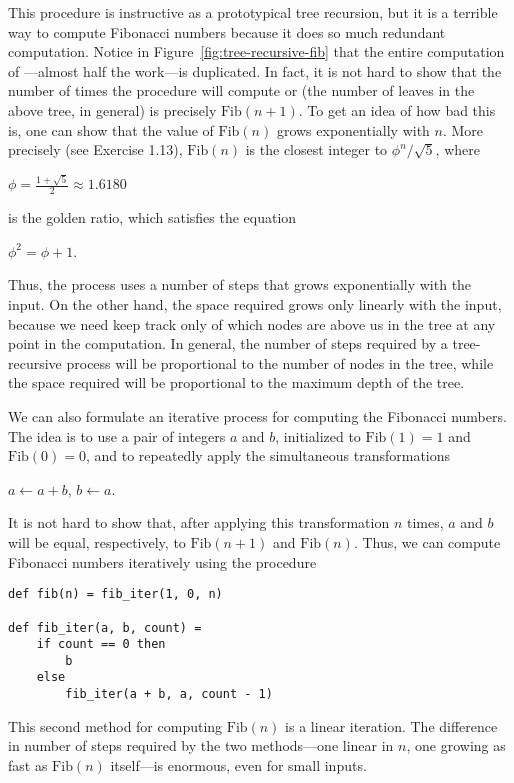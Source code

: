 This procedure is instructive as a prototypical tree recursion, but it is a terrible way to compute Fibonacci numbers because it does so much redundant computation. Notice in Figure~\ref{fig:tree-recursive-fib} that the entire computation of ---almost half the work---is duplicated. In fact, it is not hard to show that the number of times the procedure will compute  or  (the number of leaves in the above tree, in general) is precisely $\text{Fib}(n + 1)$. To get an idea of how bad this is, one can show that the value of $\text{Fib}(n)$ grows exponentially with $n$. More precisely (see Exercise 1.13), $\text{Fib}(n)$ is the closest integer to $\phi^n/\sqrt{5}$, where

$\phi = \frac{1 + \sqrt{5}}{2} \approx 1.6180$

is the golden ratio, which satisfies the equation

$\phi^2 = \phi + 1$.

Thus, the process uses a number of steps that grows exponentially with the input. On the other hand, the space required grows only linearly with the input, because we need keep track only of which nodes are above us in the tree at any point in the computation. In general, the number of steps required by a tree-recursive process will be proportional to the number of nodes in the tree, while the space required will be proportional to the maximum depth of the tree.

We can also formulate an iterative process for computing the Fibonacci numbers. The idea is to use a pair of integers $a$ and $b$, initialized to $\text{Fib}(1) = 1$ and $\text{Fib}(0) = 0$, and to repeatedly apply the simultaneous transformations

$a \leftarrow a + b$,
$b \leftarrow a$.

It is not hard to show that, after applying this transformation $n$ times, $a$ and $b$ will be equal, respectively, to $\text{Fib}(n + 1)$ and $\text{Fib}(n)$. Thus, we can compute Fibonacci numbers iteratively using the procedure

\begin{lstlisting}
def fib(n) = fib_iter(1, 0, n)

def fib_iter(a, b, count) =
    if count == 0 then
        b
    else
        fib_iter(a + b, a, count - 1)
\end{lstlisting}

This second method for computing $\text{Fib}(n)$ is a linear iteration. The difference in number of steps required by the two methods---one linear in $n$, one growing as fast as $\text{Fib}(n)$ itself---is enormous, even for small inputs.

